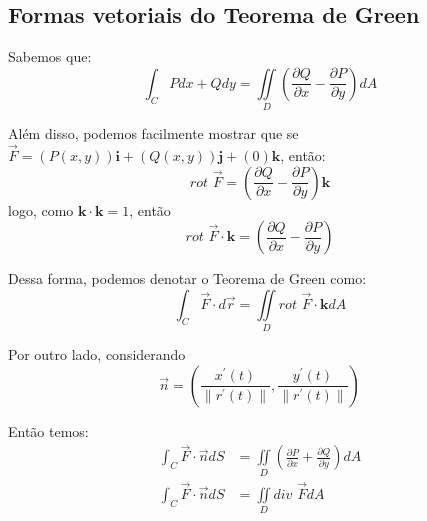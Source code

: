 \documentclass{article}
\newcommand{\doubleint}[2] {\iint\limits_{#1} #2}
\newcommand{\norm}[1] {\left.\parallel #1 \right.\parallel}
\newcommand{\PartialDer}[2] {\frac{\partial #1}{\partial #2}}
\newcommand{\FVett}[3] {\left(#1\right) \textbf{i} + \left(#2\right) \textbf{j} + \left(#3\right) \textbf {k}}
\newcommand{\Rot}[0] {\textit{rot }}
\newcommand{\Div}[0] {\textit{div }}
\begin{document}
        \subsection{Formas vetoriais do Teorema de Green}
            Sabemos que:
            \[
                \int_C Pdx + Qdy = \doubleint{D}{\left( \PartialDer{Q}{x} - \PartialDer{P}{y} \right) dA}
            \]

            Além disso, podemos facilmente mostrar que se $\vec{F} = \FVett{P(x,y)}{Q(x,y)}{0}$, então:
            \[
                \Rot \vec{F} = \left( \PartialDer{Q}{x} - \PartialDer{P}{y} \right) \textbf{k}
            \]
            logo, como $\textbf{k} \cdot \textbf{k} = 1$, então
            \[
                \Rot \vec{F} \cdot \textbf{k} = \left( \PartialDer{Q}{x} - \PartialDer{P}{y} \right)
            \]

            Dessa forma, podemos denotar o Teorema de Green como:
            \[
                \int_C \vec{F} \cdot d\vec{r} = \doubleint{D}{\Rot \vec{F} \cdot \textbf{k} dA}
            \]

            Por outro lado, considerando
            \[
                \vec{n} = \left( \frac{x^\prime (t)}{\norm{r^\prime (t)}}, \frac{y^\prime (t)}{\norm{r^\prime (t)}}
 \right)
            \]
            
            Então temos:
            \begin{align*}
                \int_C \vec{F} \cdot \vec{n} dS &= \doubleint{D}{\left( \PartialDer{P}{x} + \PartialDer{Q}{y} \right) dA}\\
                \int_C \vec{F} \cdot \vec{n} dS &= \doubleint{D}{\Div \vec{F} dA}
            \end{align*}
\end{document}
